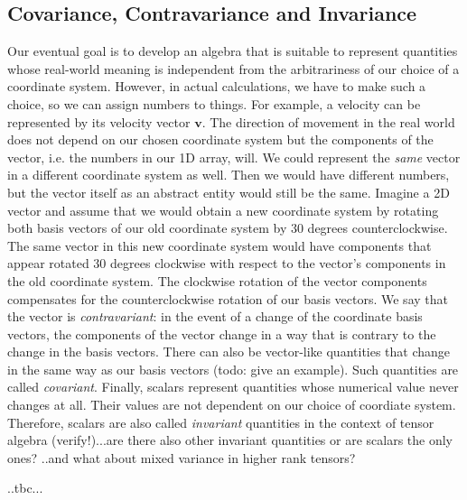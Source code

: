 \subsection{Covariance, Contravariance and Invariance}
Our eventual goal is to develop an algebra that is suitable to represent quantities whose real-world meaning is independent from the arbitrariness of our choice of a coordinate system. However, in actual calculations, we have to make such a choice, so we can assign numbers to things. For example, a velocity can be represented by its velocity vector $\mathbf{v}$. The direction of movement in the real world does not depend on our chosen coordinate system but the components of the vector, i.e. the numbers in our 1D array, will. We could represent the \emph{same} vector in a different coordinate system as well. Then we would have different numbers, but the vector itself as an abstract entity would still be the same. Imagine a 2D vector and assume that we would obtain a new coordinate system by rotating both basis vectors of our old coordinate system by 30 degrees counterclockwise. The same vector in this new coordinate system would have components that appear rotated 30 degrees clockwise with respect to the vector's components in the old coordinate system. The clockwise rotation of the vector components compensates for the counterclockwise rotation of our basis vectors. We say that the vector is \emph{contravariant}: in the event of a change of the coordinate basis vectors, the components of the vector change in a way that is contrary to the change in the basis vectors. There can also be vector-like quantities that change in the same way as our basis vectors (todo: give an example). Such quantities are called \emph{covariant}. Finally, scalars represent quantities whose numerical value never changes at all. Their values are not dependent on our choice of coordiate system. Therefore, scalars are also called \emph{invariant} quantities in the context of tensor algebra (verify!)...are there also other invariant quantities or are scalars the only ones? ..and what about mixed variance in higher rank tensors?


..tbc...



